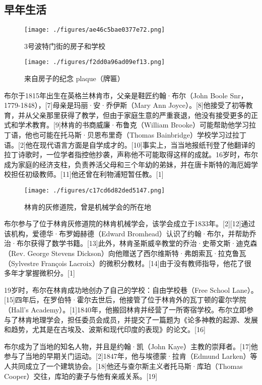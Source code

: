 \subsection{早年生活}
\begin{figure}[ht]
\centering
\texttt{[image: ./figures/ae46c5bae0377e72.png]}
\caption{3号波特门街的房子和学校} \label{fig_George_2}
\end{figure}
\begin{figure}[ht]
\centering
\texttt{[image: ./figures/f2dd0a96ad09ef13.png]}
\caption{来自房子的纪念 plaque（牌匾）} \label{fig_George_3}
\end{figure}
布尔于1815年出生在英格兰林肯市，父亲是鞋匠约翰·布尔（John Boole Snr，1779-1848），[7]母亲是玛丽·安·乔伊斯（Mary Ann Joyce）。[8]他接受了初等教育，并从父亲那里获得了教学，但由于家庭生意的严重衰退，他没有接受更多的正式和学术教育。[9]林肯的书商威廉·布鲁克（William Brooke）可能帮助他学习拉丁语，他也可能在托马斯·贝恩布里奇（Thomas Bainbridge）学校学习过拉丁语。[2]他在现代语言方面是自学成才的。[10]事实上，当当地报纸刊登了他翻译的拉丁诗歌时，一位学者指控他抄袭，声称他不可能取得这样的成就。16岁时，布尔成为家庭的经济支柱，负责养活父母和三个年幼的弟妹，并在唐卡斯特的海厄姆学校担任初级教师。[11]他还曾在利物浦短暂任教。[1]
\begin{figure}[ht]
\centering
\texttt{[image: ./figures/c17cd6d82ded5147.png]}
\caption{林肯的灰修道院，曾是机械学会的所在地} \label{fig_George_4}
\end{figure}
布尔参与了位于林肯灰修道院的林肯机械学会，该学会成立于1833年。[2][12]通过该机构，爱德华·布罗姆赫德（Edward Bromhead）认识了约翰·布尔，并帮助乔治·布尔获得了数学书籍。[13]此外，林肯圣斯威辛教堂的乔治·史蒂文斯·迪克森（Rev. George Stevens Dickson）向他赠送了西尔维斯特·弗朗索瓦·拉克鲁瓦（Sylvestre François Lacroix）的微积分教材。[14]由于没有教师指导，他花了很多年才掌握微积分。[1]

19岁时，布尔在林肯成功地创办了自己的学校：自由学校巷（Free School Lane）。[15]四年后，在罗伯特·霍尔去世后，他接管了位于林肯外的瓦丁顿的霍尔学院（Hall's Academy）。[1]1840年，他搬回林肯并经营了一所寄宿学校。布尔立即参与了林肯地理学会，担任委员会成员，并提交了一篇题为《论多神教的起源、发展和趋势，尤其是在古埃及、波斯和现代印度的表现》的论文。[16]

布尔成为了当地的知名人物，并且是约翰·凯（John Kaye）主教的崇拜者。[17]他参与了当地的早期关门运动。[2]1847年，他与埃德蒙·拉肯（Edmund Larken）等人共同成立了一个建筑协会。[18]他还与查尔斯主义者托马斯·库珀（Thomas Cooper）交往，库珀的妻子与他有亲戚关系。[19]

